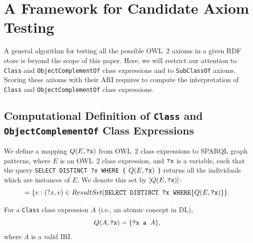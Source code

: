 \documentclass{llncs}
\begin{document}
\section{A Framework for Candidate Axiom Testing}
\label{OWL2SPARQL} 




A general algorithm for testing all the possible OWL~2 axioms in a given RDF store is beyond the scope of this paper. 
Here, we will restrict our attention to \texttt{Class} and \texttt{ObjectComplementOf} class expressions and to \texttt{SubClassOf} axioms. 
Scoring these axioms with their ARI requires to compute the interpretation of \texttt{Class} and \texttt{ObjectComplementOf} class expressions. 
 
\subsection{Computational Definition of \texttt{Class} and \texttt{ObjectComplementOf} Class Expressions}
We define a mapping $Q(E, \mbox{\tt ?x})$ from OWL~2 class expressions to SPARQL graph patterns,
where $E$ is an OWL~2 class expression, and $\mbox{\tt ?x}$ is a variable,
such that the query
\texttt{SELECT DISTINCT ?x WHERE \{} $Q(E, \mbox{\tt ?x})$ \texttt{\}}
returns all the individuals which are instances of $E$. We denote this set by
$[Q(E, \mbox{\tt ?x})]$:
\begin{equation}
[Q(E, \mbox{\tt ?x})] = \{ v : (?x, v) \in ResultSet(\mbox{\tt SELECT DISTINCT ?x WHERE} \{ Q(E, \mbox{\tt ?x}) \} \}.
\end{equation} 

For a \texttt{Class} class expression $A$ (i.e., an atomic concept in DL), 
\begin{equation}
Q(A, \mbox{\tt ?x}) = \{\mbox{\tt ?x a }A \},
\end{equation}
where $A$ is a valid IRI.
\end{document}
